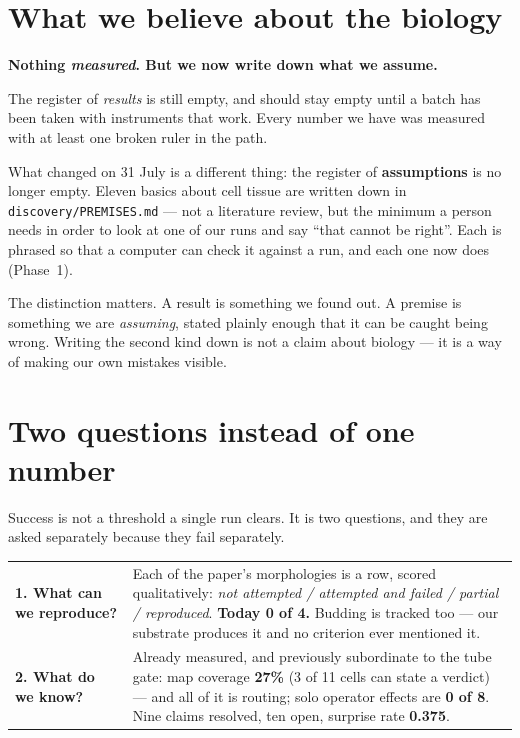\documentclass[11pt,a4paper]{article}
\begin{document}
\section{What we believe about the biology}

\begin{tcolorbox}[colback=grey!6,colframe=grey!45,boxrule=0.7pt,arc=2pt]
\begin{center}\large\textbf{Nothing \emph{measured}. But we now write down what we assume.}\end{center}

The register of \emph{results} is still empty, and should stay empty until a batch has been taken
with instruments that work. Every number we have was measured with at least one broken ruler in the
path.

What changed on 31 July is a different thing: the register of \textbf{assumptions} is no longer
empty. Eleven basics about cell tissue are written down in \texttt{discovery/PREMISES.md} --- not a
literature review, but the minimum a person needs in order to look at one of our runs and say
``that cannot be right''. Each is phrased so that a computer can check it against a run, and each
one now does (Phase~1).

The distinction matters. A result is something we found out. A premise is something we are
\emph{assuming}, stated plainly enough that it can be caught being wrong. Writing the second kind
down is not a claim about biology --- it is a way of making our own mistakes visible.
\end{tcolorbox}

\section{Two questions instead of one number}

Success is not a threshold a single run clears. It is two questions, and they are asked separately
because they fail separately.

\begin{center}\small
\begin{tabular}{@{}p{4.3cm} p{10.3cm}@{}}
\toprule
\textbf{1. What can we reproduce?}
& Each of the paper's morphologies is a row, scored qualitatively: \emph{not attempted / attempted
and failed / partial / reproduced}. \textbf{Today 0 of 4.} Budding is tracked too --- our substrate
produces it and no criterion ever mentioned it.\\
\addlinespace
\textbf{2. What do we know?}
& Already measured, and previously subordinate to the tube gate: map coverage \textbf{27\%} (3 of 11
cells can state a verdict) --- and all of it is routing; solo operator effects are \textbf{0 of 8}.
Nine claims resolved, ten open, surprise rate \textbf{0.375}.\\
\bottomrule
\end{tabular}
\end{center}
\end{document}

